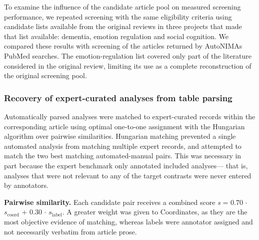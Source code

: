 To examine the influence of the candidate article pool on measured screening performance, we repeated screening with the same eligibility criteria using candidate lists available from the original reviews in three projects that made that list available: dementia, emotion regulation and social cognition. We compared these results with screening of the articles returned by AutoNIMA\textquotesingle s PubMed searches. The emotion-regulation list covered only part of the literature considered in the original review, limiting its use as a complete reconstruction of the original screening pool.

\subsubsection{Recovery of expert-curated analyses from table parsing}

Automatically parsed analyses were matched to expert-curated records within the corresponding article using optimal one-to-one assignment with the Hungarian algorithm over pairwise similarities. Hungarian matching prevented a single automated analysis from matching multiple expert records, and attempted to match the two best matching automated-manual pairs. This was necessary in part because the expert benchmark only annotated included analyses--- that is, analyses that were not relevant to any of the target contrasts were never entered by annotators.

\textbf{Pairwise similarity.} Each candidate pair receives a combined score \emph{s} = 0.70 $\cdot$ $s_{\mathrm{coord}}$ + 0.30 $\cdot$ $s_{\mathrm{label}}$. A greater weight was given to Coordinates, as they are the most objective evidence of matching, whereas labels were annotator assigned and not necessarily verbatim from article prose.

